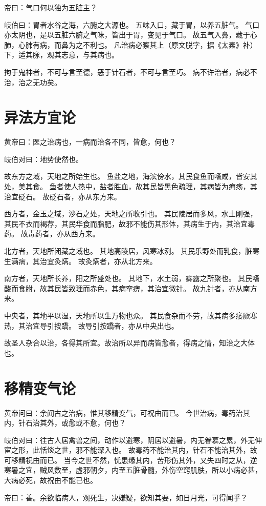 \documentclass{article}%
\begin{document}
帝曰：气口何以独为五脏主？

岐伯曰：胃者水谷之海，六腑之大源也。
五味入口，藏于胃，以养五脏气。
气口亦太阴也，是以五脏六腑之气味，皆出于胃，变见于气口。
故五气入鼻，藏于心肺，心肺有病，而鼻为之不利也。
凡治病必察其上（原文脱字，据《太素》补）下，适其脉，观其志意，与其病也。

拘于鬼神者，不可与言至德，恶于针石者，不可与言至巧。
病不许治者，病必不治，治之无功矣。


\section{异法方宜论}
黄帝曰：医之治病也，一病而治各不同，皆愈，何也？

岐伯对曰：地势使然也。

故东方之域，天地之所始生也。
鱼盐之地，海滨傍水，其民食鱼而嗜咸，皆安其处，美其食。
鱼者使人热中，盐者胜血，故其民皆黑色疏理，其病皆为痈疡，其治宜砭石。
故砭石者，亦从东方来。

西方者，金玉之域，沙石之处，天地之所收引也。
其民陵居而多风，水土刚强，其民不衣而褐荐，其民华食而脂肥，故邪不能伤其形体，其病生于内，其治宜毒药。
故毒药者，亦从西方来。

北方者，天地所闭藏之域也。
其地高陵居，风寒冰洌。
其民乐野处而乳食，脏寒生满病，其治宜灸焫。
故灸焫者，亦从北方来。

南方者，天地所长养，阳之所盛处也。
其地下，水土弱，雾露之所聚也。
其民嗜酸而食胕，故其民皆致理而赤色，其病挛痹，其治宜微针。
故九针者，亦从南方来。

中央者，其地平以湿，天地所以生万物也众。
其民食杂而不劳，故其病多痿厥寒热，其治宜导引按蹻。
故导引按蹻者，亦从中央出也。

故圣人杂合以治，各得其所宜。故治所以异而病皆愈者，得病之情，知治之大体也。


\section{移精变气论}
黄帝问曰：余闻古之治病，惟其移精变气，可祝由而已。
今世治病，毒药治其内，针石治其外，或愈或不愈，何也？

岐伯对曰：往古人居禽兽之间，动作以避寒，阴居以避暑，内无眷慕之累，外无伸宦之形，此恬惔之世，邪不能深入也。
故毒药不能治其内，针石不能治其外，故可移精祝由而已。
当今之世不然，忧患缘其内，苦形伤其外，又失四时之从，逆寒暑之宜，贼风数至，虚邪朝夕，内至五脏骨髓，外伤空窍肌肤，所以小病必甚，大病必死，故祝由不能已也。

帝曰：善。余欲临病人，观死生，决嫌疑，欲知其要，如日月光，可得闻乎？
\end{document}
